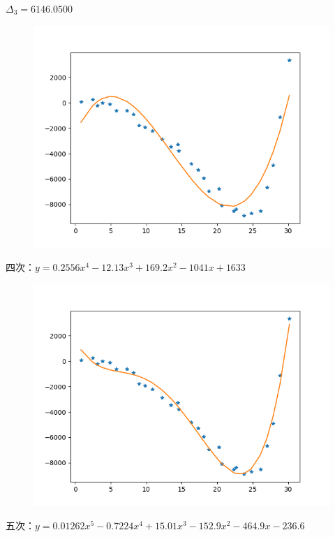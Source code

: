 \documentclass[lang=cn,a4paper]{elegantpaper}
\begin{document}
    $\Delta_3=6146.0500$
    \begin{figure}[H]
        \includegraphics[scale=0.4]{1-3.png}
    \end{figure}
    四次：$y=0.2556x^4-12.13x^3+169.2x^2-1041x+1633$
    \begin{figure}[H]
        \includegraphics[scale=0.4]{1-4.png}
    \end{figure}
    五次：$y=0.01262x^5-0.7224x^4+15.01x^3-152.9x^2-464.9x-236.6$
\end{document}
